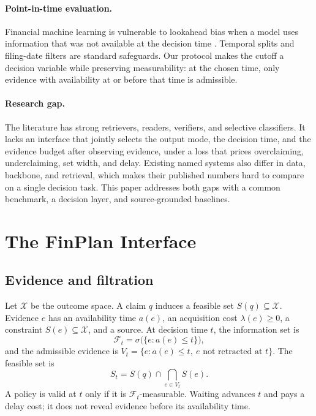 \documentclass[11pt]{article}
\newcommand{\method}{FinPlan}
\begin{document}
\paragraph{Point-in-time evaluation.}
Financial machine learning is vulnerable to lookahead bias when a model uses information that was not available at the decision time \citep{lopezdeprado2018advances}. Temporal splits and filing-date filters are standard safeguards. Our protocol makes the cutoff a decision variable while preserving measurability: at the chosen time, only evidence with availability at or before that time is admissible.

\paragraph{Research gap.}
The literature has strong retrievers, readers, verifiers, and selective classifiers. It lacks an interface that jointly selects the output mode, the decision time, and the evidence budget after observing evidence, under a loss that prices overclaiming, underclaiming, set width, and delay. Existing named systems also differ in data, backbone, and retrieval, which makes their published numbers hard to compare on a single decision task. This paper addresses both gaps with a common benchmark, a decision layer, and source-grounded baselines.

\section{The \method{} Interface}

\subsection{Evidence and filtration}
Let $\mathcal X$ be the outcome space. A claim $q$ induces a feasible set $S(q)\subseteq\mathcal X$. Evidence $e$ has an availability time $a(e)$, an acquisition cost $\lambda(e)\ge 0$, a constraint $S(e)\subseteq\mathcal X$, and a source. At decision time $t$, the information set is
\begin{equation}
\mathcal F_t=\sigma\bigl(\{e: a(e)\le t\}\bigr),
\end{equation}
and the admissible evidence is $V_t=\{e: a(e)\le t,\ e\text{ not retracted at }t\}$. The feasible set is
\begin{equation}
S_t=S(q)\cap\bigcap_{e\in V_t}S(e).
\label{eq:feasible}
\end{equation}
A policy is valid at $t$ only if it is $\mathcal F_t$-measurable. Waiting advances $t$ and pays a delay cost; it does not reveal evidence before its availability time.
\end{document}

